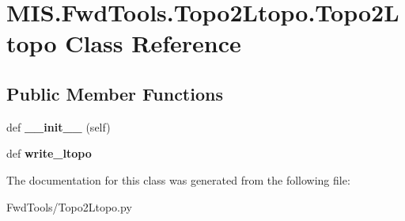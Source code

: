 \hypertarget{classMIS_1_1FwdTools_1_1Topo2Ltopo_1_1Topo2Ltopo}{}\section{M\+I\+S.\+Fwd\+Tools.\+Topo2\+Ltopo.\+Topo2\+Ltopo Class Reference}
\label{classMIS_1_1FwdTools_1_1Topo2Ltopo_1_1Topo2Ltopo}
\subsection*{Public Member Functions}
\begin{DoxyCompactItemize}
\item 
\mbox{\label{classMIS_1_1FwdTools_1_1Topo2Ltopo_1_1Topo2Ltopo_a464d5a7eab7832f6110c8a9bd201a643}} 
def {\bfseries \+\_\+\+\_\+init\+\_\+\+\_\+} (self)
\item 
\mbox{\label{classMIS_1_1FwdTools_1_1Topo2Ltopo_1_1Topo2Ltopo_aeb1e28d3e05fed407fed5e185ec896a0}} 
def {\bfseries write\+\_\+ltopo}
\end{DoxyCompactItemize}


The documentation for this class was generated from the following file\+:\begin{DoxyCompactItemize}
\item 
Fwd\+Tools/Topo2\+Ltopo.\+py\end{DoxyCompactItemize}
